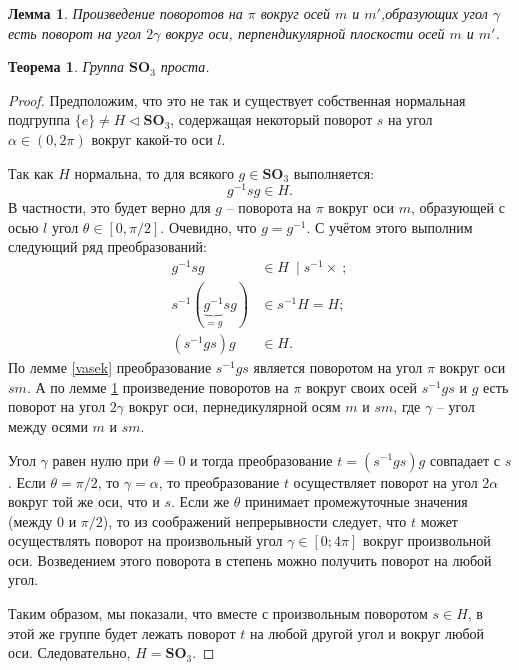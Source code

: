 \documentclass{article}
\newtheorem{lemma}{Лемма}[section]
\newtheorem{theorem}{Теорема}[section]
\begin{document}
\begin{lemma} \label{dima}
    Произведение поворотов на $\pi$ вокруг осей $m$ и $m'$,образующих угол $\gamma$ есть поворот на угол $2 \gamma$ вокруг оси, перпендикулярной плоскости осей $m$ и $m'$.
\end{lemma}

\begin{theorem}
    Группа $\mathbf{SO}_3$ проста.
\end{theorem}
\begin{proof}
    Предположим, что это не так и существует собственная нормальная подгруппа $\{ e \} \neq H \triangleleft \mathbf{SO}_3$, содержащая некоторый поворот $s$ на угол $\alpha \in (0, 2\pi)$ вокруг какой-то оси $l$.
    
    Так как $H$ нормальна, то для всякого $g \in \mathbf{SO}_3$ выполняется: $$ g^{-1} s g \in H. $$ В частности, это будет верно для $g$ -- поворота на $\pi$ вокруг оси $m$, образующей с осью $l$ угол $\theta \in [0, \pi / 2]$. Очевидно, что $ g = g^{-1} $. С учётом этого выполним следующий ряд преобразований:
    \begin{align*}
        g^{-1} s g &\in H \ \mid s^{-1} \times \ ; \\
        s^{-1} (\underbrace{g^{-1}}_{=g} s g) & \in s^{-1} H = H; \\
        (s^{-1} g s) g & \in H.
    \end{align*}
    По лемме \ref{vasek} преобразование $s^{-1} g s$ является поворотом на угол $\pi$ вокруг оси $sm$. А по лемме \ref{dima} произведение поворотов на $\pi$ вокруг своих осей $s^{-1 } g s$ и $g$ есть поворот на угол $2 \gamma$ вокруг оси, пернедикулярной осям $m$ и $sm$, где $\gamma$ -- угол между осями $m$ и $sm$.

    Угол $\gamma$ равен нулю при $\theta = 0$ и тогда преобразование $t = (s^{-1} g s) g$ совпадает с $s$. Если $\theta = \pi / 2$, то $\gamma = \alpha$, то преобразование $t$ осуществляет поворот на угол $2\alpha$ вокруг той же оси, что и $s$. Если же $\theta$ принимает промежуточные значения (между $0$ и $\pi/2$), то из соображений непрерывности следует, что $t$ может осуществлять поворот на произвольный угол $\gamma \in [0; 4\pi]$ вокруг произвольной оси. Возведением этого поворота в степень можно получить поворот на любой угол.

    Таким образом, мы показали, что вместе с произвольным поворотом $s \in H$, в этой же группе будет лежать поворот $t$ на любой другой угол и вокруг любой оси. Следовательно, $H = \mathbf{SO}_3$.
\end{proof}
\end{document}
